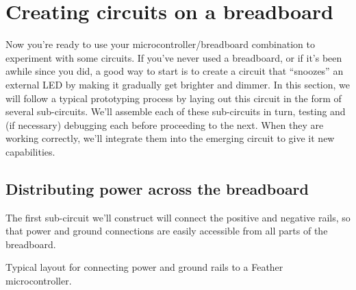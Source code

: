 \section{Creating circuits on a breadboard}
Now you're ready to use your microcontroller/breadboard combination to experiment with some circuits.
If you've never used a breadboard, or if it’s been awhile since you did, a good way to start is to create a circuit that ``snoozes'' an external LED by making it gradually get brighter and dimmer.
In this section, we will follow a typical prototyping process by laying out this circuit in the form of several sub-circuits.
We'll assemble each of these sub-circuits in turn, testing and (if necessary) debugging each before proceeding to the next.
When they are working correctly, we'll integrate them into the emerging circuit to give it new capabilities.

\subsection{Distributing power across the breadboard}
The first sub-circuit we'll construct will connect the positive and negative rails, so that power and ground connections are easily accessible from all parts of the breadboard.
\begin{marginfigure}[-0cm]
	\begin{center}
		\caption[Power/ground rails connection schematic]{Typical layout for connecting power and ground rails to a Feather microcontroller.}
	\end{center}
\end{marginfigure}

